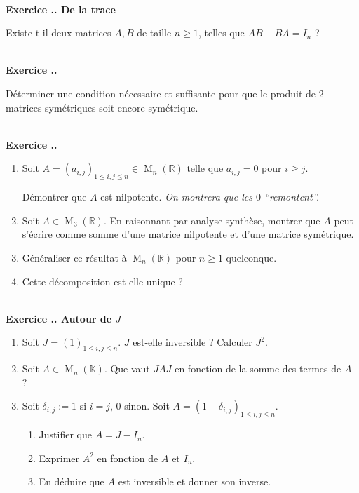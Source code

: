 \documentclass{article}
\newcommand{\mb}[1]{\mathbb{#1}}
\renewcommand{\M}{\operatorname{M}}
\newcounter{exo}
\newcommand{\exercice}[1][\null]{\textbf{\\ Exercice \thesection.\theexo. #1} \addtocounter{exo}{1}}
\begin{document}
\exercice[De la trace]

Existe-t-il deux matrices $A,B$ de taille $n \ge 1$, telles que $AB - BA = I_n$ ?

\exercice

Déterminer une condition nécessaire et suffisante pour que le produit de 2 matrices symétriques soit encore symétrique.

\exercice

\begin{enumerate}

\item Soit $A = (a_{i,j})_{1 \le i,j \le n} \in \M_n(\mb{R})$ telle que $a_{i,j} = 0$ pour $i \ge j$.

Démontrer que $A$ est nilpotente. \emph{On montrera que les $0$ ``remontent''.}

\item Soit $A \in \M_3(\mb{R})$. En raisonnant par analyse-synthèse, montrer que $A$ peut s'écrire comme somme d'une matrice nilpotente et d'une matrice symétrique.

\item Généraliser ce résultat à $\M_n(\mb{R})$ pour $n \ge 1$ quelconque.

\item Cette décomposition est-elle unique ?

\end{enumerate}




\exercice[Autour de $J$]

\begin{enumerate}

\item Soit $J = (1)_{1 \le i,j \le n}$. $J$ est-elle inversible ? Calculer $J^2$.

\item Soit $A \in \M_n(\mb{K})$. Que vaut $JAJ$ en fonction de la somme des termes de $A$ ?

\item Soit $\delta_{i,j} := 1$ si $i = j$, $0$ sinon. Soit $A = (1 - \delta_{i,j})_{1 \le i,j \le n}$.

\begin{enumerate}
 \item Justifier que $A= J - I_n$.
 
 \item Exprimer $A^2$ en fonction de $A$ et $I_n$.
 
 \item En déduire que $A$ est inversible et donner son inverse.
 
 \end{enumerate}

\end{enumerate}
\end{document}
